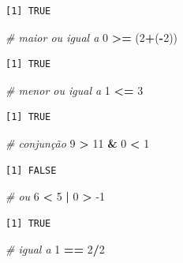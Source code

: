 \documentclass[12pt,brazil,oneside]{book}
\newenvironment{Shaded}{\begin{snugshade}}{\end{snugshade}}
\newcommand{\CommentTok}[1]{\textcolor[rgb]{0.56,0.35,0.01}{\textit{#1}}}
\newcommand{\DecValTok}[1]{\textcolor[rgb]{0.00,0.00,0.81}{#1}}
\newcommand{\NormalTok}[1]{#1}
\newcommand{\OperatorTok}[1]{\textcolor[rgb]{0.81,0.36,0.00}{\textbf{#1}}}
\newcommand{\StringTok}[1]{\textcolor[rgb]{0.31,0.60,0.02}{#1}}
\begin{document}
\begin{verbatim}
[1] TRUE
\end{verbatim}

\begin{Shaded}
\begin{Highlighting}[]
\CommentTok{# maior ou igual a }
\DecValTok{0} \OperatorTok{>=}\StringTok{ }\NormalTok{(}\DecValTok{2}\OperatorTok{+}\NormalTok{(}\OperatorTok{-}\DecValTok{2}\NormalTok{))}
\end{Highlighting}
\end{Shaded}

\begin{verbatim}
[1] TRUE
\end{verbatim}

\begin{Shaded}
\begin{Highlighting}[]
\CommentTok{# menor ou igual a }
\DecValTok{1} \OperatorTok{<=}\StringTok{ }\DecValTok{3}
\end{Highlighting}
\end{Shaded}

\begin{verbatim}
[1] TRUE
\end{verbatim}

\begin{Shaded}
\begin{Highlighting}[]
\CommentTok{# conjunção}
\DecValTok{9} \OperatorTok{>}\StringTok{ }\DecValTok{11} \OperatorTok{&}\StringTok{ }\DecValTok{0} \OperatorTok{<}\StringTok{ }\DecValTok{1}
\end{Highlighting}
\end{Shaded}

\begin{verbatim}
[1] FALSE
\end{verbatim}

\begin{Shaded}
\begin{Highlighting}[]
\CommentTok{# ou}
\DecValTok{6} \OperatorTok{<}\StringTok{ }\DecValTok{5} \OperatorTok{|}\StringTok{ }\DecValTok{0} \OperatorTok{>}\StringTok{ }\DecValTok{-1}
\end{Highlighting}
\end{Shaded}

\begin{verbatim}
[1] TRUE
\end{verbatim}

\begin{Shaded}
\begin{Highlighting}[]
\CommentTok{# igual a}
\DecValTok{1} \OperatorTok{==}\StringTok{ }\DecValTok{2}\OperatorTok{/}\DecValTok{2}
\end{Highlighting}
\end{Shaded}
\end{document}
